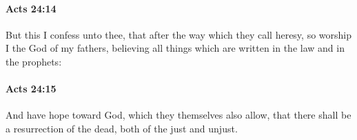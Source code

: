 		\paragraph{Acts 24:14} %
			\label{ACTS-24-14}

			But this I confess unto thee, that after the way which they call heresy, so worship I the God of my fathers, believing all things which are written in the law and in the prophets:

			\begin{framed}
			\scriptsize
				\begin{compactdesc}
					\item[SBLG] 
				\end{compactdesc}
			\end{framed}

		\paragraph{Acts 24:15} %
			\label{ACTS-24-15}

			And have hope toward God, which they themselves also allow, that there shall be a resurrection of the dead, both of the just and unjust.

